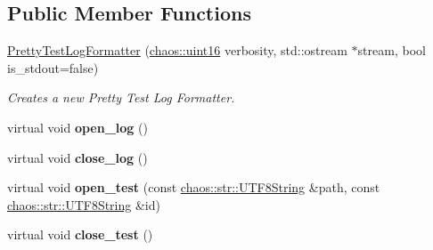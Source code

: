 \subsection*{Public Member Functions}
\begin{DoxyCompactItemize}
\item 
\hypertarget{classchaos_1_1test_1_1log__formatter_1_1_pretty_test_log_formatter_ac844397bcd31b15b72acfa75423994fb}{\hyperlink{classchaos_1_1test_1_1log__formatter_1_1_pretty_test_log_formatter_ac844397bcd31b15b72acfa75423994fb}{Pretty\-Test\-Log\-Formatter} (\hyperlink{namespacechaos_ac3888b1c9e56da7fbbdb3ab8425b4068}{chaos\-::uint16} verbosity, std\-::ostream $\ast$stream, bool is\-\_\-stdout=false)}\label{classchaos_1_1test_1_1log__formatter_1_1_pretty_test_log_formatter_ac844397bcd31b15b72acfa75423994fb}

\begin{DoxyCompactList}\small\item\em Creates a new Pretty Test Log Formatter. \end{DoxyCompactList}\item 
\hypertarget{classchaos_1_1test_1_1log__formatter_1_1_pretty_test_log_formatter_acfc156f1c2b4c0b688573f648c6b7349}{virtual void {\bfseries open\-\_\-log} ()}\label{classchaos_1_1test_1_1log__formatter_1_1_pretty_test_log_formatter_acfc156f1c2b4c0b688573f648c6b7349}

\item 
\hypertarget{classchaos_1_1test_1_1log__formatter_1_1_pretty_test_log_formatter_a55167e42a2e956fc520ab7671945bf36}{virtual void {\bfseries close\-\_\-log} ()}\label{classchaos_1_1test_1_1log__formatter_1_1_pretty_test_log_formatter_a55167e42a2e956fc520ab7671945bf36}

\item 
\hypertarget{classchaos_1_1test_1_1log__formatter_1_1_pretty_test_log_formatter_ae77aea3084d292464322207573b18a53}{virtual void {\bfseries open\-\_\-test} (const \hyperlink{classchaos_1_1str_1_1_u_t_f8_string}{chaos\-::str\-::\-U\-T\-F8\-String} \&path, const \hyperlink{classchaos_1_1str_1_1_u_t_f8_string}{chaos\-::str\-::\-U\-T\-F8\-String} \&id)}\label{classchaos_1_1test_1_1log__formatter_1_1_pretty_test_log_formatter_ae77aea3084d292464322207573b18a53}

\item 
\hypertarget{classchaos_1_1test_1_1log__formatter_1_1_pretty_test_log_formatter_a02d6208a064405bcd183661755eb2289}{virtual void {\bfseries close\-\_\-test} ()}\label{classchaos_1_1test_1_1log__formatter_1_1_pretty_test_log_formatter_a02d6208a064405bcd183661755eb2289}


\end{DoxyCompactItemize}
